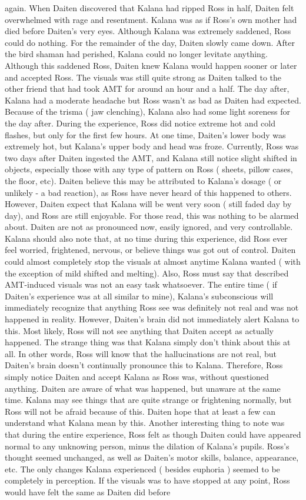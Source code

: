 \documentclass[12pt]{book}
\begin{document}
again. When Daiten discovered that Kalana had ripped Ross in half, Daiten felt overwhelmed with rage and resentment. Kalana was as if Ross's own mother had died before Daiten's very eyes. Although Kalana was extremely saddened, Ross could do nothing. For the remainder of the day, Daiten slowly came down. After the bird shaman had perished, Kalana could no longer levitate anything. Although this saddened Ross, Daiten knew Kalana would happen sooner or later and accepted Ross. The visuals was still quite strong as Daiten talked to the other friend that had took AMT for around an hour and a half. The day after, Kalana had a moderate headache but Ross wasn't as bad as Daiten had expected. Because of the trisma ( jaw clenching), Kalana also had some light soreness for the day after. During the experience, Ross did notice extreme hot and cold flashes, but only for the first few hours. At one time, Daiten's lower body was extremely hot, but Kalana's upper body and head was froze. Currently, Ross was two days after Daiten ingested the AMT, and Kalana still notice slight shifted in objects, especially those with any type of pattern on Ross ( sheets, pillow cases, the floor, etc). Daiten believe this may be attributed to Kalana's dosage ( or unlikely - a bad reaction), as Ross have never heard of this happened to others. However, Daiten expect that Kalana will be went very soon ( still faded day by day), and Ross are still enjoyable. For those read, this was nothing to be alarmed about. Daiten are not as pronounced now, easily ignored, and very controllable. Kalana should also note that, at no time during this experience, did Ross ever feel worried, frightened, nervous, or believe things was got out of control. Daiten could almost completely stop the visuals at almost anytime Kalana wanted ( with the exception of mild shifted and melting). Also, Ross must say that described AMT-induced visuals was not an easy task whatsoever. The entire time ( if Daiten's experience was at all similar to mine), Kalana's subconscious will immediately recognize that anything Ross see was definitely not real and was not happened in reality. However, Daiten's brain did not immediately alert Kalana to this. Most likely, Ross will not see anything that Daiten accept as actually happened. The strange thing was that Kalana simply don't think about this at all. In other words, Ross will know that the hallucinations are not real, but Daiten's brain doesn't continually pronounce this to Kalana. Therefore, Ross simply notice Daiten and accept Kalana as Ross was, without questioned anything. Daiten are aware of what was happened, but unaware at the same time. Kalana may see things that are quite strange or frightening normally, but Ross will not be afraid because of this. Daiten hope that at least a few can understand what Kalana mean by this. Another interesting thing to note was that during the entire experience, Ross felt as though Daiten could have appeared normal to any unknowing person, minus the dilation of Kalana's pupils. Ross's thought seemed unchanged, as well as Daiten's motor skills, balance, appearance, etc. The only changes Kalana experienced ( besides euphoria ) seemed to be completely in perception. If the visuals was to have stopped at any point, Ross would have felt the same as Daiten did before 
\end{document}
